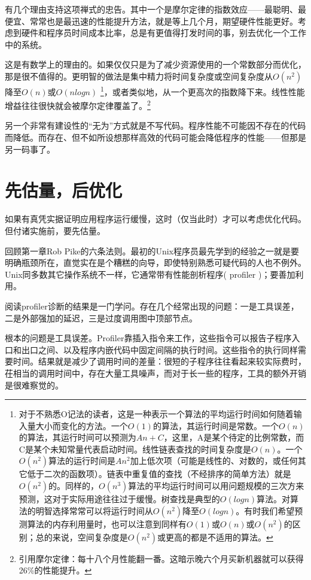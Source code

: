 \documentclass[12pt,oneside]{book}
\begin{document}
\begin{common-format}
有几个理由支持这项禅式的忠告。其中一个是摩尔定律的指数效应——最聪明、最便宜、常常也是最迅速的性能提升方法，就是等上几个月，期望硬件性能更好。考虑到硬件和程序员时间成本比率，总是有更值得打发时间的事，别去优化一个工作中的系统。

这是有数学上的理由的。如果仅仅只是为了减少资源使用的一个常数部分而优化，那是很不值得的。更明智的做法是集中精力将时间复杂度或空间复杂度从$O(n^2)$降至$ O(n) $或$ O(n log n) $ \footnote{对于不熟悉O记法的读者，这是一种表示一个算法的平均运行时间如何随着输入量大小而变化的方法。一个$ O(1) $的算法，其运行时间是常数。一个$ O(n) $的算法，其运行时间可以预测为$ An + C $，这里，A是某个待定的比例常数，而C是某个未知常量代表启动时间。线性链表查找的时间复杂度是$ O(n) $。一个$ O(n^2) $算法的运行时间是$ An^2 $加上低次项（可能是线性的、对数的，或任何其它低于二次的函数项）。链表中重复值的查找（不经排序的简单方法）就是$ O(n^2) $的。同样的，$ O(n^3) $算法的平均运行时间可以用问题规模的三次方来预测，这对于实际用途往往过于缓慢。树查找是典型的$ O(log n) $算法。对算法的明智选择常常可以将运行时间从$O(n^2)$降至$ O(log n) $。有时我们希望预测算法的内存利用量时，也可以注意到同样有$ O(1) $或$ O(n) $或$O(n^2)$的区别；总的来说，空间复杂度是$O(n^2)$或更高的都是不适用的算法。}，或者类似地，从一个更高次的指数降下来。线性性能增益往往很快就会被摩尔定律覆盖了。\footnote{引用摩尔定律：每十八个月性能翻一番。这暗示晚六个月买新机器就可以获得26\%{}的性能提升。}

另一个非常有建设性的“无为”方式就是不写代码。程序性能不可能因不存在的代码而降低。而存在、但不如所设想那样高效的代码可能会降低程序的性能——但那是另一码事了。

\section{先估量，后优化}
如果有真凭实据证明应用程序运行缓慢，这时（仅当此时）才可以考虑优化代码。但付诸实施前，要先估量。

回顾第一章Rob Pike的六条法则。最初的Unix程序员最先学到的经验之一就是要明确瓶颈所在，直觉实在是个糟糕的向导，即使特别熟悉可疑代码的人也不例外。Unix同多数其它操作系统不一样，它通常带有性能剖析程序( profiler )；要善加利用。

阅读profiler诊断的结果是一门学问。存在几个经常出现的问题：一是工具误差，二是外部强加的延迟，三是过度调用图中顶部节点。

根本的问题是工具误差。Profiler靠插入指令来工作，这些指令可以报告子程序入口和出口之间、以及程序内嵌代码中固定间隔的执行时间。这些指令的执行同样需要时间。结果就是减少了调用时间的差量：很短的子程序往往看起来较实际费时，茌相当的调用时间中，存在大量工具噪声，而对于长一些的程序，工具的额外开销是很难察觉的。


\end{common-format}
\end{document}
